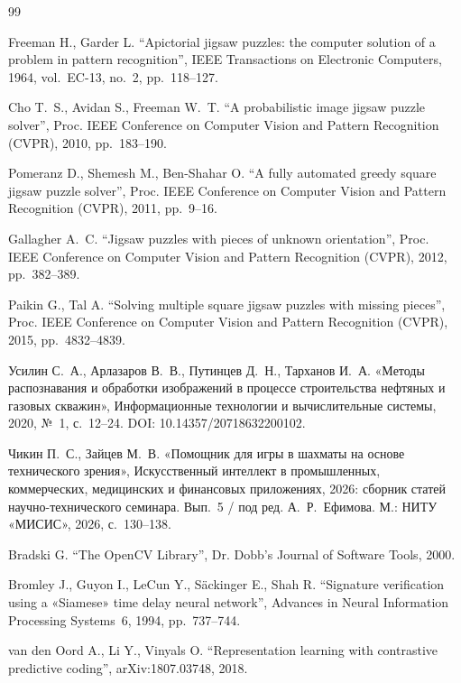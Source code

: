 \documentclass{misisarticle}
\begin{document}
\begin{thebibliography}{99}

 Freeman H., Garder L. “Apictorial jigsaw puzzles: the computer solution of a problem in pattern recognition”, IEEE Transactions on Electronic Computers, 1964, vol.~EC-13, no.~2, pp.~118--127.

 Cho T.~S., Avidan S., Freeman W.~T. “A probabilistic image jigsaw puzzle solver”, Proc. IEEE Conference on Computer Vision and Pattern Recognition (CVPR), 2010, pp.~183--190.

 Pomeranz D., Shemesh M., Ben-Shahar O. “A fully automated greedy square jigsaw puzzle solver”, Proc. IEEE Conference on Computer Vision and Pattern Recognition (CVPR), 2011, pp.~9--16.

 Gallagher A.~C. “Jigsaw puzzles with pieces of unknown orientation”, Proc. IEEE Conference on Computer Vision and Pattern Recognition (CVPR), 2012, pp.~382--389.

 Paikin G., Tal A. “Solving multiple square jigsaw puzzles with missing pieces”, Proc. IEEE Conference on Computer Vision and Pattern Recognition (CVPR), 2015, pp.~4832--4839.

 Усилин С.~А., Арлазаров В.~В., Путинцев Д.~Н., Тарханов И.~А. «Методы распознавания и обработки изображений в процессе строительства нефтяных и газовых скважин», Информационные технологии и вычислительные системы, 2020, №~1, с.~12--24. DOI: 10.14357/20718632200102.

 Чикин П.~С., Зайцев М.~В. «Помощник для игры в шахматы на основе технического зрения», Искусственный интеллект в промышленных, коммерческих, медицинских и финансовых приложениях, 2026: сборник статей научно-технического семинара. Вып.~5 / под ред. А.~Р.~Ефимова. М.: НИТУ «МИСИС», 2026, с.~130--138.

 Bradski G. “The OpenCV Library”, Dr. Dobb’s Journal of Software Tools, 2000.

 Bromley J., Guyon I., LeCun Y., Säckinger E., Shah R. “Signature verification using a «Siamese» time delay neural network”, Advances in Neural Information Processing Systems~6, 1994, pp.~737--744.

 van den Oord A., Li Y., Vinyals O. “Representation learning with contrastive predictive coding”, arXiv:1807.03748, 2018.


\end{thebibliography}
\end{document}

